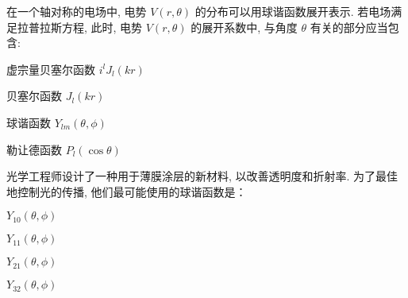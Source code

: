 \documentclass{njustexam}
\begin{document}
\begin{problem}
  在一个轴对称的电场中, 电势 $V(r,  \theta)$ 的分布可以用球谐函数展开表示. 
  若电场满足拉普拉斯方程, 
  此时, 电势 $V(r,  \theta)$ 的展开系数中, 与角度 $\theta$ 有关的部分应当包含: 
  \begin{abcd}
  \item 虚宗量贝塞尔函数 $i^l J_l(kr)$
  \item 贝塞尔函数 $J_l(kr)$
  \item 球谐函数 $Y_{lm}(\theta,  \phi)$
  \item 勒让德函数 $P_l(\cos\theta)$

  \end{abcd}
\end{problem}



  
  
  

  \begin{problem}
    光学工程师设计了一种用于薄膜涂层的新材料, 以改善透明度和折射率. 为了最佳地控制光的传播, 他们最可能使用的球谐函数是：
    \begin{abcd}

    \item $Y_{10}(\theta,  \phi)$
    
    \item $Y_{11}(\theta,  \phi)$
    
    \item $Y_{21}(\theta,  \phi)$
    
    \item $Y_{32}(\theta,  \phi)$
   \end{abcd}

  \end{problem}
\end{document}
